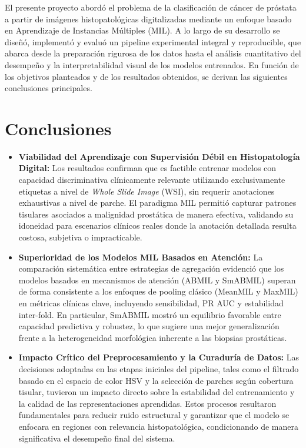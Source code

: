 El presente proyecto abordó el problema de la clasificación de cáncer de próstata a partir de imágenes histopatológicas digitalizadas mediante un enfoque basado en Aprendizaje de Instancias Múltiples (MIL). A lo largo de su desarrollo se diseñó, implementó y evaluó un pipeline experimental integral y reproducible, que abarca desde la preparación rigurosa de los datos hasta el análisis cuantitativo del desempeño y la interpretabilidad visual de los modelos entrenados. En función de los objetivos planteados y de los resultados obtenidos, se derivan las siguientes conclusiones principales.

\section{Conclusiones}

\begin{itemize}

    \item \textbf{Viabilidad del Aprendizaje con Supervisión Débil en Histopatología Digital:}  
    Los resultados confirman que es factible entrenar modelos con capacidad discriminativa clínicamente relevante utilizando exclusivamente etiquetas a nivel de \textit{Whole Slide Image} (WSI), sin requerir anotaciones exhaustivas a nivel de parche. El paradigma MIL permitió capturar patrones tisulares asociados a malignidad prostática de manera efectiva, validando su idoneidad para escenarios clínicos reales donde la anotación detallada resulta costosa, subjetiva o impracticable.

    \item \textbf{Superioridad de los Modelos MIL Basados en Atención:}  
    La comparación sistemática entre estrategias de agregación evidenció que los modelos basados en mecanismos de atención (ABMIL y SmABMIL) superan de forma consistente a los enfoques de pooling clásico (MeanMIL y MaxMIL) en métricas clínicas clave, incluyendo sensibilidad, PR AUC y estabilidad inter-fold. En particular, SmABMIL mostró un equilibrio favorable entre capacidad predictiva y robustez, lo que sugiere una mejor generalización frente a la heterogeneidad morfológica inherente a las biopsias prostáticas.

    \item \textbf{Impacto Crítico del Preprocesamiento y la Curaduría de Datos:}  
    Las decisiones adoptadas en las etapas iniciales del pipeline, tales como el filtrado basado en el espacio de color HSV y la selección de parches según cobertura tisular, tuvieron un impacto directo sobre la estabilidad del entrenamiento y la calidad de las representaciones aprendidas. Estos procesos resultaron fundamentales para reducir ruido estructural y garantizar que el modelo se enfocara en regiones con relevancia histopatológica, condicionando de manera significativa el desempeño final del sistema.


\end{itemize}
